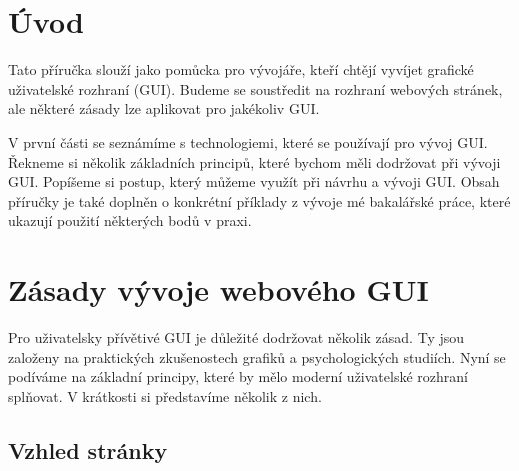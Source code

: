 \section{Úvod}
\label{chap:introduction}

Tato příručka slouží jako pomůcka pro vývojáře, kteří chtějí vyvíjet grafické uživatelské rozhraní (GUI). Budeme se soustředit na rozhraní webových stránek, ale některé zásady lze aplikovat pro jakékoliv GUI.

V první části se seznámíme s technologiemi, které se používají pro vývoj GUI. Řekneme si několik základních principů, které bychom měli dodržovat při vývoji GUI. Popíšeme si postup, který můžeme využít při návrhu a vývoji GUI. Obsah příručky je také doplněn o konkrétní příklady z vývoje mé bakalářské práce, které ukazují použití některých bodů v praxi.

\section{Zásady vývoje webového GUI}
\label{sec:principles}

Pro uživatelsky přívětivé GUI je důležité dodržovat několik zásad. Ty jsou založeny na praktických zkušenostech grafiků a psychologických studiích. Nyní se podíváme na základní principy, které by mělo moderní uživatelské rozhraní splňovat. V krátkosti si představíme několik z nich.

\subsection{Vzhled stránky}
\label{subsec:visual-principles}

